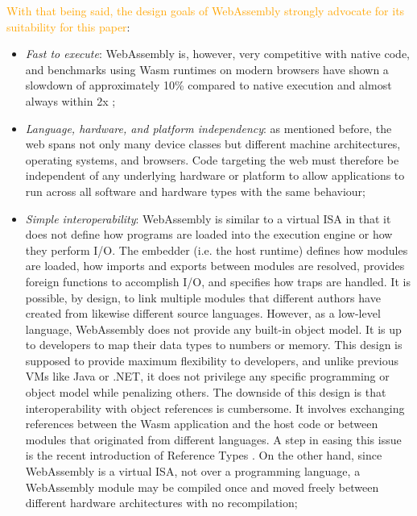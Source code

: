 \textcolor{orange}{With that being said, the design goals of WebAssembly strongly advocate for its suitability for this paper}:

\begin{itemize}
    \item \emph{Fast to execute}: WebAssembly is, however, very competitive with native code, and benchmarks using Wasm runtimes on modern browsers have shown a slowdown of approximately 10\% compared to native execution and almost always within 2x \cite{haas2017bringing};
    \item \emph{Language, hardware, and platform independency}: as mentioned before, the web spans not only many device classes but different machine architectures, operating systems, and browsers. Code targeting the web must therefore be independent of any underlying hardware or platform to allow applications to run across all software and hardware types with the same behaviour;
    \item \emph{Simple interoperability}: WebAssembly is similar to a virtual ISA in that it does not define how programs are loaded into the execution engine or how they perform I/O. The embedder (i.e. the host runtime) defines how modules are loaded, how imports and exports between modules are resolved, provides foreign functions to accomplish I/O, and specifies how traps are handled. It is possible, by design, to link multiple modules that different authors have created from likewise different source languages. However, as a low-level language, WebAssembly does not provide any built-in object model. It is up to developers to map their data types to numbers or memory. This design is supposed to provide maximum flexibility to developers, and unlike previous VMs like Java or .NET, it does not privilege any specific programming or object model while penalizing others. The downside of this design is that interoperability with object references is cumbersome. It involves exchanging references between the Wasm application and the host code or between modules that originated from different languages. A step in easing this issue is the recent introduction of Reference Types \cite{reference-types}. On the other hand, since WebAssembly is a virtual ISA, not over a programming language, a WebAssembly module may be compiled once and moved freely between different hardware architectures with no recompilation;

\end{itemize}
